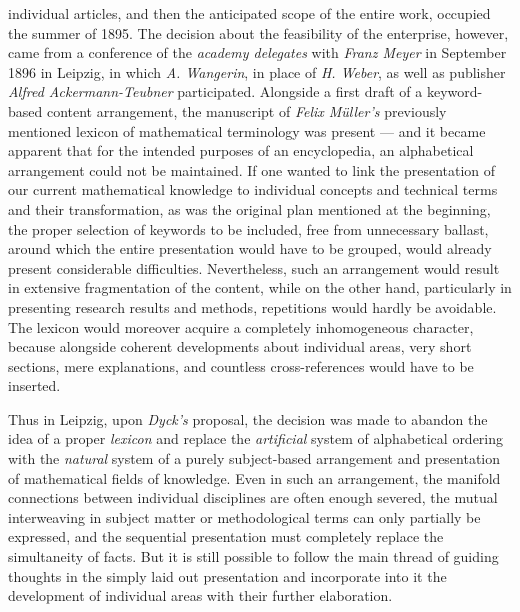 \thispagestyle{fancy}

\vspace{0.5cm}

individual articles, and then the anticipated scope of the entire work, occupied the summer of 1895. The decision about the feasibility of the enterprise, however, came from a conference of the \textit{academy delegates} with \textit{Franz Meyer} in September 1896 in Leipzig, in which \textit{A. Wangerin}, in place of \textit{H. Weber}, as well as publisher \textit{Alfred Ackermann-Teubner} participated. Alongside a first draft of a keyword-based content arrangement, the manuscript of \textit{Felix Müller's} previously mentioned lexicon of mathematical terminology was present — and it became apparent that for the intended purposes of an encyclopedia, an alphabetical arrangement could not be maintained. If one wanted to link the presentation of our current mathematical knowledge to individual concepts and technical terms and their transformation, as was the original plan mentioned at the beginning, the proper selection of keywords to be included, free from unnecessary ballast, around which the entire presentation would have to be grouped, would already present considerable difficulties. Nevertheless, such an arrangement would result in extensive fragmentation of the content, while on the other hand, particularly in presenting research results and methods, repetitions would hardly be avoidable. The lexicon would moreover acquire a completely inhomogeneous character, because alongside coherent developments about individual areas, very short sections, mere explanations, and countless cross-references would have to be inserted. 

Thus in Leipzig, upon \textit{Dyck's} proposal, the decision was made to abandon the idea of a proper \textit{lexicon} and replace the \textit{artificial} system of alphabetical ordering with the \textit{natural} system of a purely subject-based arrangement and presentation of mathematical fields of knowledge. Even in such an arrangement, the manifold connections between individual disciplines are often enough severed, the mutual interweaving in subject matter or methodological terms can only partially be expressed, and the sequential presentation must completely replace the simultaneity of facts. But it is still possible to follow the main thread of guiding thoughts in the simply laid out presentation and incorporate into it the development of individual areas with their further elaboration.
